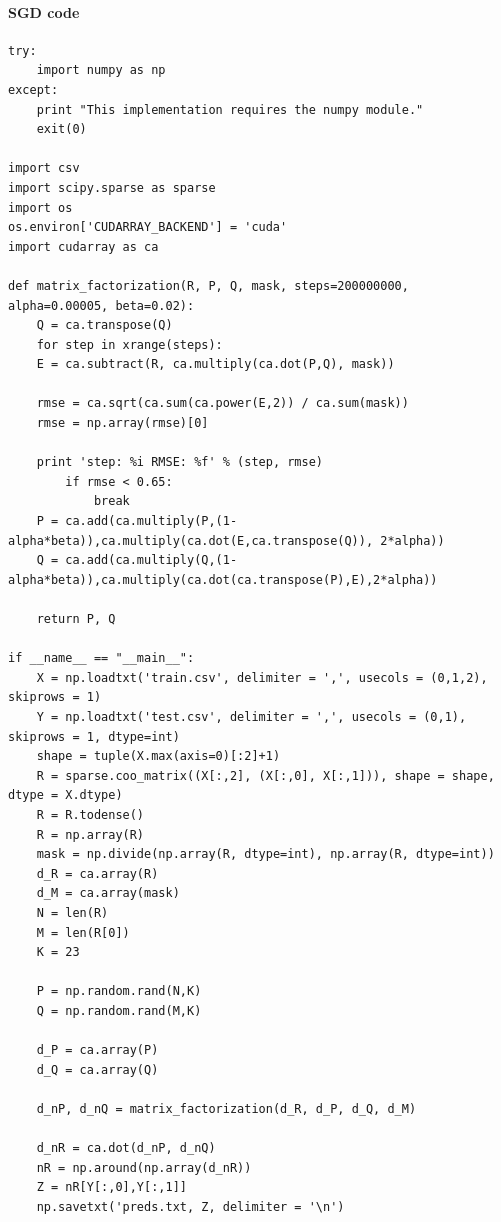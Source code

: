 \documentclass{article}
\begin{document}
\paragraph{SGD code}
\begin{verbatim}  
try:
    import numpy as np
except:
    print "This implementation requires the numpy module."
    exit(0)

import csv
import scipy.sparse as sparse
import os
os.environ['CUDARRAY_BACKEND'] = 'cuda'
import cudarray as ca

def matrix_factorization(R, P, Q, mask, steps=200000000, alpha=0.00005, beta=0.02):
    Q = ca.transpose(Q)
    for step in xrange(steps):
 	E = ca.subtract(R, ca.multiply(ca.dot(P,Q), mask))

	rmse = ca.sqrt(ca.sum(ca.power(E,2)) / ca.sum(mask))
	rmse = np.array(rmse)[0]

 	print 'step: %i RMSE: %f' % (step, rmse)
        if rmse < 0.65:
            break
	P = ca.add(ca.multiply(P,(1-alpha*beta)),ca.multiply(ca.dot(E,ca.transpose(Q)), 2*alpha))
	Q = ca.add(ca.multiply(Q,(1-alpha*beta)),ca.multiply(ca.dot(ca.transpose(P),E),2*alpha))

    return P, Q
    
if __name__ == "__main__":
    X = np.loadtxt('train.csv', delimiter = ',', usecols = (0,1,2), skiprows = 1)
    Y = np.loadtxt('test.csv', delimiter = ',', usecols = (0,1), skiprows = 1, dtype=int)
    shape = tuple(X.max(axis=0)[:2]+1)
    R = sparse.coo_matrix((X[:,2], (X[:,0], X[:,1])), shape = shape, dtype = X.dtype)
    R = R.todense()
    R = np.array(R)
    mask = np.divide(np.array(R, dtype=int), np.array(R, dtype=int))
    d_R = ca.array(R)
    d_M = ca.array(mask)
    N = len(R)
    M = len(R[0])
    K = 23

    P = np.random.rand(N,K)
    Q = np.random.rand(M,K)

    d_P = ca.array(P)
    d_Q = ca.array(Q)

    d_nP, d_nQ = matrix_factorization(d_R, d_P, d_Q, d_M)

    d_nR = ca.dot(d_nP, d_nQ)
    nR = np.around(np.array(d_nR))
    Z = nR[Y[:,0],Y[:,1]]
    np.savetxt('preds.txt, Z, delimiter = '\n')
\end{verbatim}  
\end{document}
